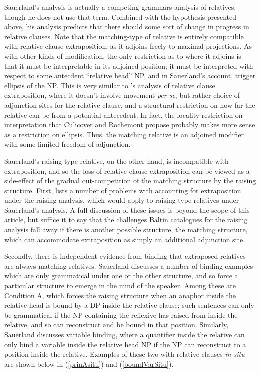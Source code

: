 Sauerland's analysis is actually a competing grammars analysis of relatives, though he does not use that term. Combined with the hypothesis presented above, his analysis predicts that there should some sort of change in progress in relative clauses. Note that the matching-type of relative is entirely compatible with relative clause extraposition, as it adjoins freely to maximal projections. As with other kinds of modification, the only restriction as to where it adjoins is that it must be interpretable in its adjoined position; it must be interpreted with respect to some antecdent ``relative head'' NP, and in Sauerland's account, trigger ellipsis of the NP. This is very similar to \citet{culicoverrochemont1990}'s analysis of relative clause extraposition, where it doesn't involve movement \textsl{per se}, but rather choice of adjunction sites for the relative clause, and a structural restriction on how far the relative can be from a potential antecedent. In fact, the locality restriction on interpretation that Culicover and Rochemont propose probably makes more sense as a restriction on ellipsis. Thus, the matching relative is an adjoined modifier with some limited freedom of adjunction.

Sauerland's raising-type relative, on the other hand, is incompatible with extraposition, and so the loss of relative clause extraposition can be viewed as a side-effect of the gradual out-competition of the matching structure by the raising structure. First, \citet{baltin2006} lists a number of problems with accounting for extraposition under the raising analysis, which would apply to raising-type relatives under Sauerland's analysis. A full discussion of these issues is beyond the scope of this article, but suffice it to say that the challenges Baltin catalogues for the raising analysis fall away if there is another possible structure, the matching structure, which can accommodate extraposition as simply an additional adjunction site.

Secondly, there is independent evidence from binding that extraposed relatives are always matching relatives. Sauerland discusses a number of binding examples which are only grammatical under one or the other structure, and so force a particular structure to emerge in the mind of the speaker. Among these are Condition A, which forces the raising structure when an anaphor inside the relative head is bound by a DP inside the relative clause; such sentences can only be grammatical if the NP containing the reflexive has raised from inside the relative, and so can reconstruct and be bound in that position. Similarly, Sauerland discusses variable binding, where a quantifier inside the relative can only bind a variable inside the relative head NP if the NP can reconstruct to a position inside the relative. Examples of these two with relative clauses \textsl{in situ} are shown below in (\ref{prinAsitu}) and (\ref{boundVarSitu}). 

